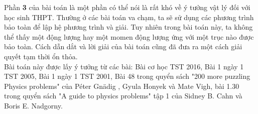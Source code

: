 \indent Phần \textbf{3} của bài toán là một phần có thể nói là rất khó về ý tưởng vật lý đối với học sinh THPT. Thường ở các bài toán va chạm, ta sẽ sử dụng các phương trình bảo toàn để lập hệ phương trình và giải. Tuy nhiên trong bài toán này, ta không thể thấy một động lượng hay một momen động lượng ứng với một trục nào được bảo toàn. Cách dẫn dắt và lời giải của bài toán cũng đã đưa ra một cách giải quyết tạm thời ổn thỏa.\\%


Bài toán này được lấy ý tưởng từ các bài: Bài cơ học TST 2016,  Bài 1 ngày 1 TST 2005, Bài 1 ngày 1 TST 2001, Bài 48 trong quyển sách "200 more puzzling Physics problems" của  Péter Gnädig , Gyula Honyek và Mate Vigh, bài 1.30 trong quyển sách "A guide to physics problems" tập 1 của Sidney B. Cahn và Boris E. Nadgorny. 